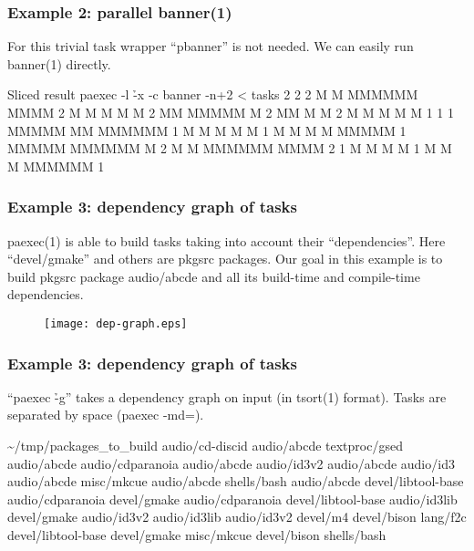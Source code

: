 \documentclass[hyperref={colorlinks=true}]{beamer}
\begin{document}
\linespread{0.5}
\begin{frame}[fragile]
  \frametitle{Example 2: parallel banner(1)}
For this trivial task wrapper ``pbanner'' is not needed.
We can easily run banner(1) directly.
  \begin{block}{}
      \begin{CodeSmall}{Sliced result}
\prompt{\$} paexec -l \h{-x} -c banner -n+2 < tasks
2 
2 
2  M    M  MMMMMM   MMMM
2   M  M   M       M    M
2    MM    MMMMM   M
2    MM    M       M
2   M  M   M       M    M
1 
1 
1  MMMMM     MM    MMMMMM
1  M    M   M  M   M
1  M    M  M    M  MMMMM
1  MMMMM   MMMMMM  M
2  M    M  MMMMMM   MMMM
2 
1  M       M    M  M
1  M       M    M  MMMMMM
1 
\prompt{\$}
      \end{CodeSmall}
  \end{block}
\end{frame}
\linespread{1}

\begin{frame}[fragile]
  \frametitle{Example 3: dependency graph of tasks}
  paexec(1) is able to build tasks taking into account their ``dependencies''.
Here ``devel/gmake'' and others are pkgsrc packages. Our goal in this example
is to build pkgsrc package audio/abcde and all its build-time and compile-time
dependencies.
  \begin{block}{}
    \begin{figure}
      \texttt{[image: dep-graph.eps]}
    \end{figure}
  \end{block}
\end{frame}

\begin{frame}[fragile]
  \frametitle{Example 3: dependency graph of tasks}
``paexec \h{-g}'' takes a dependency graph on input (in tsort(1) format).
Tasks are separated by space (paexec -md=).
  \begin{block}{}
      \begin{CodeSmall}{\~{}/tmp/packages\_to\_build}
audio/cd-discid audio/abcde
textproc/gsed audio/abcde
audio/cdparanoia audio/abcde
audio/id3v2 audio/abcde
audio/id3 audio/abcde
misc/mkcue audio/abcde
shells/bash audio/abcde
devel/libtool-base audio/cdparanoia
devel/gmake audio/cdparanoia
devel/libtool-base audio/id3lib
devel/gmake audio/id3v2
audio/id3lib audio/id3v2
devel/m4 devel/bison
lang/f2c devel/libtool-base
devel/gmake misc/mkcue
devel/bison shells/bash
      \end{CodeSmall}
  \end{block}
\end{frame}
\end{document}
